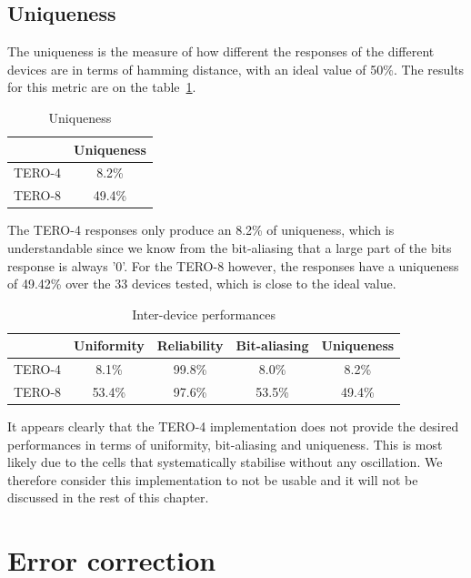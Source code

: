 \subsection{Uniqueness}

The uniqueness is the measure of how different the responses of the different devices are in terms of hamming distance, with an ideal value of 50\%. The results for this metric are on the table~\ref{tab:uniqueness}.

\begin{table}[H]
    \centering
    \begin{tabular}{|c|c|}
        \hline
            & Uniqueness\\
         \hline
         TERO-4 & 8.2\%\\
         \hline
         TERO-8 & 49.4\%\\
         \hline
    \end{tabular}
    \caption{Uniqueness}
    \label{tab:uniqueness}
\end{table}

The TERO-4 responses only produce an 8.2\% of uniqueness, which is understandable since we know from the bit-aliasing that a large part of the bits response is always '0'. For the TERO-8 however, the responses have a uniqueness of 49.42\% over the 33 devices tested, which is close to the ideal value. 


\begin{table}[H]
    \centering
    \begin{tabular}{|c|c|c|c|c|}
        \hline
            & Uniformity & Reliability & Bit-aliasing & Uniqueness\\
         \hline
         TERO-4 & 8.1\% & 99.8\% & 8.0\% & 8.2\%\\
         \hline
         TERO-8 & 53.4\% & 97.6\% & 53.5\% & 49.4\%\\
         \hline
    \end{tabular}
    \caption{Inter-device performances}
    \label{tab:summary_inter}
\end{table}

It appears clearly that the TERO-4 implementation does not provide the desired performances in terms of uniformity, bit-aliasing and uniqueness. This is most likely due to the cells that systematically stabilise without any oscillation. We therefore consider this implementation to not be usable and it will not be discussed in the rest of this chapter.

\newpage
\section{Error correction}


